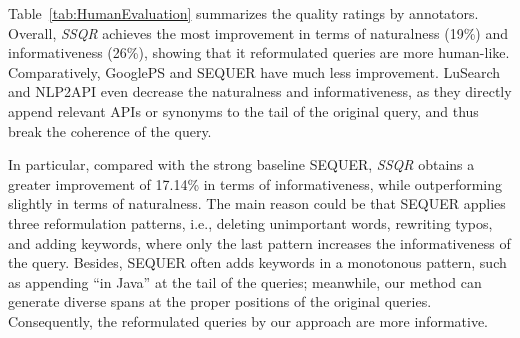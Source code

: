 \documentclass[sigconf,screen]{acmart}
\newcommand{\ie}{\hbox{i.e.}\xspace}
\newcommand{\ourmethod}{\textit{SSQR}\xspace}
\newcommand{\wan}[1]{\textcolor{cyan!70!blue}{[Wan: #1]}}
\begin{document}
Table~\ref{tab:HumanEvaluation} summarizes the quality ratings by annotators. Overall, \ourmethod achieves the most improvement in terms of naturalness (19\%) and informativeness (26\%), showing that it reformulated queries are more human-like. Comparatively, GooglePS and SEQUER have much less improvement. LuSearch and NLP2API even decrease the naturalness and informativeness, as they directly append relevant APIs or synonyms to the tail of the original query, and thus break the coherence of the query.%



In particular, compared with the strong baseline SEQUER, \ourmethod obtains a greater improvement of 17.14\% in terms of informativeness, while outperforming slightly in terms of naturalness.
The main reason could be that SEQUER applies three reformulation patterns, \ie, deleting unimportant words, rewriting typos, and adding keywords, where only the last pattern increases the informativeness of the query.
Besides, SEQUER often adds keywords in a monotonous pattern, such as appending ``in Java'' at the tail of the queries; meanwhile, our method can generate diverse spans at the proper positions of the original queries. 
Consequently, the reformulated queries by our approach are more informative. 


\end{document}
